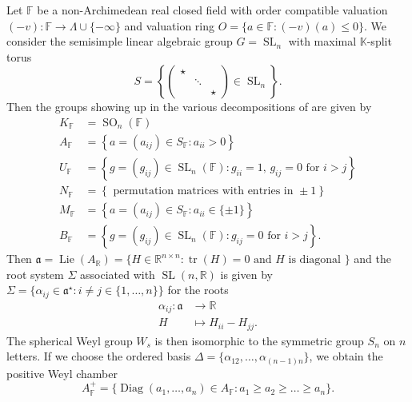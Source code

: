 \documentclass[12pt]{amsart}
\newcommand{\F}{\mathbb{F} }
\newcommand{\R}{\mathbb{R} }
\newcommand{\K}{\mathbb{K}}
\newcommand{\fraka}{\mathfrak{a}}
\numberwithin{equation}{section}
\theoremstyle{remark} %
\begin{document}
Let $\F$ be a non-Archimedean real closed field with order compatible valuation $(-v) \colon \F \to \Lambda \cup \{ -\infty\}$ and valuation ring $O = \{a \in \F \colon (-v)(a) \leq 0\}$. We consider the semisimple linear algebraic group $G= \operatorname{SL}_n$ with maximal $\K$-split torus
$$
S = \left\{ \begin{pmatrix}
	\star & & \\ & \ddots & \\ && \star
\end{pmatrix} \in \operatorname{SL}_n \right\}.
$$ 
Then the groups showing up in the various decompositions of \cite[Section \ref{I-sec:decompositions}]{AppAGRCF} are given by 
\begin{align*}
	K_\F &= \operatorname{SO}_n(\F)\\
	A_{\F} &= \left\{ a = (a_{ij}) \in S_{\F} \colon a_{ii}>0   \right\} \\
	U_{\F} &= \left\{g=(g_{ij}) \in \operatorname{SL}_{n}(\F) \colon  g_{ii}= 1, \, g_{ij} = 0 \text{ for } i>j  \right\} \\
	N_{\F} &= \left\{ \text{ permutation matrices with entries in }\pm 1 \right\} \\
	M_{\F} & = \left\{ a=(a_{ij}) \in S_{\F} \colon a_{ii} \in \{ \pm 1\}    \right\} \\
	B_{\F} &= \left\{ g = (g_{ij}) \in \operatorname{SL}_n(\F) \colon g_{ij} = 0 \text{ for } i > j \right\}.
\end{align*}
Then $\fraka = \operatorname{Lie}(A_\R) = \{ H \in \R^{n\times n} \colon \operatorname{tr}(H) = 0 \text{ and $H$ is diagonal }  \}$ and the root system $\Sigma$ associated with $\operatorname{SL}(n,\R)$ is given by $\Sigma = \{ \alpha_{ij} \in \fraka^\star \colon i\neq j \in \{1, \ldots , n\} \}$ for the roots
\begin{align*}
	\alpha_{ij} \colon \fraka &\to \R \\
	H& \mapsto H_{ii} - H_{jj}.
\end{align*}
The spherical Weyl group $W_s$ is then isomorphic to the symmetric group $S_n$ on $n$ letters. If we choose the ordered basis $\Delta = \{ \alpha_{12}, \ldots , \alpha_{(n-1)n}\}$, we obtain the positive Weyl chamber
$$
A_\F^+ = \{  \operatorname{Diag}(a_1, \ldots , a_n) \in A_\F \colon a_1 \geq a_2 \geq \ldots  \geq a_n  \}.
$$
\end{document}
